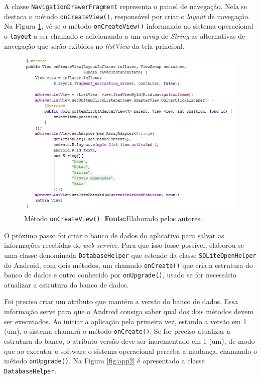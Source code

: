 	\pagebreak

	\par A classe \texttt{NavigationDrawerFragment} representa o painel de
navegação. Nela se destaca o método \texttt{onCreateView()}, responsável por
criar o \textit{layout} de navegação. Na Figura \ref{fig:app1}, vê-se o método
\texttt{onCreateView()} informando ao sistema operacional o \texttt{layout} a
ser chamado e adicionando a um \textit{array} de \textit{String} as
alternativas de navegação que serão exibidos no \textit{listView} da tela
principal.

	\begin{figure}[h!] 
		\centerline{\includegraphics[scale=0.7]{./imagens/2_q_metodologico/4_procedimentos_resultados/42_aplicativo/app1.png}}
		\caption[Método onCreateView()]{Método \texttt{onCreateView()}.
		\textbf{Fonte:}Elaborado pelos autores.}
		\label{fig:app1}
	\end{figure}
	
	\pagebreak
	
	\par O próximo passo foi criar o banco de dados do aplicativo para salvar as
informações recebidas do \textit{web service}. Para que isso fosse possível,
elaborou-se uma classe denominada \texttt{DatabaseHelper} que estende da classe
\texttt{SQLiteOpenHelper} do Android, com dois métodos, um chamado
\texttt{onCreate()} que cria a estrutura do banco de dados e outro conhecido
por \texttt{onUpgrade()}, usado se for necessário atualizar a estrutura do
banco de dados.

	\par Foi preciso criar um atributo que mantém a versão do banco de dados. Essa
informação serve para que o Android consiga saber qual dos dois métodos devem
ser executados. Ao iniciar a aplicação pela primeira vez, estando a versão em 1
(um), o sistema chamará o método \texttt{onCreate()}. Se for preciso atualizar
a estrutura do banco, o atributo versão deve ser incrementado em 1 (um), de
modo que ao executar o software o sistema operacional perceba a mudança,
chamando o método \texttt{onUpgrade()}. Na Figura \ref{fig:app2} é apresentado a
classe \texttt{DatabaseHelper}.

